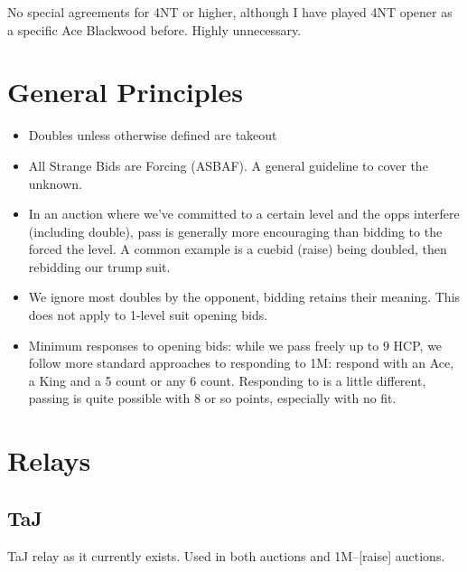 \documentclass[main]{subfile}
\begin{document}
		No special agreements for 4NT or higher, although I have played 4NT opener as a specific Ace Blackwood before.  Highly unnecessary.
	
	\section{General Principles}
	
	\begin{itemize}
		\item Doubles unless otherwise defined are takeout
		\item All Strange Bids are Forcing (ASBAF).  A general guideline to cover the unknown.
		\item In an auction where we've committed to a certain level and the opps interfere (including double), pass is generally more encouraging than bidding to the forced the level.  A common example is a cuebid (raise) being doubled, then rebidding our trump suit.
		\item We ignore most doubles by the opponent, bidding retains their meaning.  This does not apply to 1-level suit opening bids.
		\item Minimum responses to opening bids: while we pass  freely up to 9 HCP, we follow more standard approaches to responding to 1M: respond with an Ace, a King and a 5 count or any 6 count.  Responding to  is a little different, passing is quite possible with 8 or so points, especially with no fit.  
	\end{itemize}	
	
	\section{Relays}
	
	\subsection{TaJ}
	TaJ relay as it currently exists.  Used in both  auctions and 1M--[raise] auctions.
	
\end{document}
